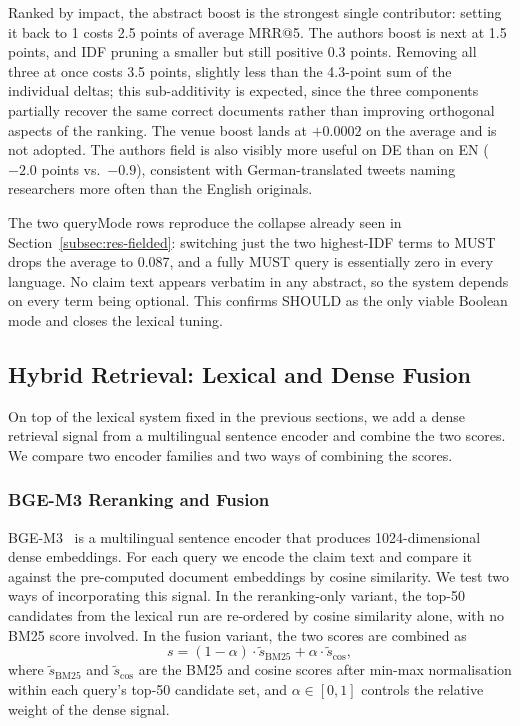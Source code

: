 Ranked by impact, the abstract boost is the strongest single contributor: setting it back to 1 costs 2.5 points of average MRR@5. The authors boost is next at 1.5 points, and IDF pruning a smaller but still positive 0.3 points. Removing all three at once costs 3.5 points, slightly less than the 4.3-point sum of the individual deltas; this sub-additivity is expected, since the three components partially recover the same correct documents rather than improving orthogonal aspects of the ranking. The venue boost lands at $+0.0002$ on the average and is not adopted. The authors field is also visibly more useful on DE than on EN ($-2.0$ points vs.\ $-0.9$), consistent with German-translated tweets naming researchers more often than the English originals.

The two queryMode rows reproduce the collapse already seen in Section~\ref{subsec:res-fielded}: switching just the two highest-IDF terms to MUST drops the average to 0.087, and a fully MUST query is essentially zero in every language. No claim text appears verbatim in any abstract, so the system depends on every term being optional. This confirms SHOULD as the only viable Boolean mode and closes the lexical tuning.

\subsection{Hybrid Retrieval: Lexical and Dense Fusion}
\label{subsec:res-hybrid}

On top of the lexical system fixed in the previous sections, we add a dense retrieval signal from a multilingual sentence encoder and combine the two scores. We compare two encoder families and two ways of combining the scores.

\subsubsection{BGE-M3 Reranking and Fusion}

BGE-M3~\cite{chen2024bge} is a multilingual sentence encoder that produces 1024-dimensional dense embeddings. For each query we encode the claim text and compare it against the pre-computed document embeddings by cosine similarity. We test two ways of incorporating this signal. In the reranking-only variant, the top-50 candidates from the lexical run are re-ordered by cosine similarity alone, with no BM25 score involved. In the fusion variant, the two scores are combined as
\begin{equation}
    s = (1-\alpha)\cdot\widetilde{s}_{\mathrm{BM25}} + \alpha\cdot\widetilde{s}_{\mathrm{cos}},
    \label{eq:fusion}
\end{equation}
where $\widetilde{s}_{\mathrm{BM25}}$ and $\widetilde{s}_{\mathrm{cos}}$ are the BM25 and cosine scores after min-max normalisation within each query's top-50 candidate set, and $\alpha \in [0,1]$ controls the relative weight of the dense signal.

